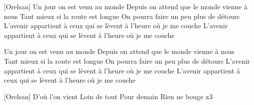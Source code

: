 [Orelsan]
Un jour on est venu au monde
Depuis on attend que le monde vienne à nous
Tant mieux si la route est longue
On pourra faire un peu plus de détours
L'avenir appartient à ceux qui se lèvent à l'heure où je me couche
L'avenir appartient à ceux qui se lèvent à l'heure où je me couche


Un jour on est venu au monde
Depuis on attend que le monde vienne à nous
Tant mieux si la route est longue
On pourra faire un peu plus de détours
L'avenir appartient à ceux qui se lèvent à l'heure où je me couche
L'avenir appartient à ceux qui se lèvent à l'heure où je me couche

[Orelsan]
D'où l'on vient
Loin de tout
Pour demain
Rien ne bouge x3
